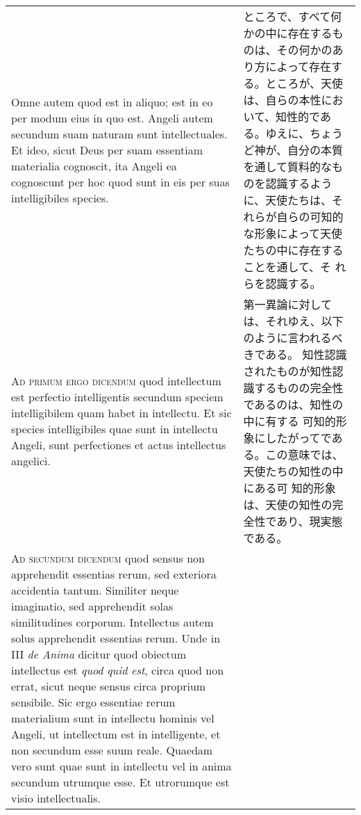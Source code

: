 \documentclass[10pt]{jsarticle} %
\begin{document}
\begin{longtable}{p{21em}p{21em}}
\\


Omne autem quod est in
aliquo; est in eo per modum eius in quo est. Angeli autem secundum suam
naturam sunt intellectuales. Et ideo, sicut Deus per suam essentiam
materialia cognoscit, ita Angeli ea cognoscunt per hoc quod sunt in eis
per suas intelligibiles species.



&

ところで、すべて何かの中に存在するものは、その何かのあり方によって存在す
 る。ところが、天使は、自らの本性において、知性的である。ゆえに、ちょう
 ど神が、自分の本質を通して質料的なものを認識するように、天使たちは、そ
 れらが自らの可知的な形象によって天使たちの中に存在することを通して、そ
 れらを認識する。


\\

{\scshape Ad primum ergo dicendum} quod intellectum est
perfectio intelligentis secundum speciem intelligibilem quam habet in
intellectu. Et sic species intelligibiles quae sunt in intellectu
Angeli, sunt perfectiones et actus intellectus angelici.


&

第一異論に対しては、それゆえ、以下のように言われるべきである。
知性認識されたものが知性認識するものの完全性であるのは、知性の中に有する
 可知的形象にしたがってである。この意味では、天使たちの知性の中にある可
 知的形象は、天使の知性の完全性であり、現実態である。


\\


{\scshape Ad secundum dicendum} quod sensus non
apprehendit essentias rerum, sed exteriora accidentia tantum. Similiter
neque imaginatio, sed apprehendit solas similitudines
corporum. Intellectus autem solus apprehendit essentias rerum. Unde in
III {\itshape de Anima} dicitur quod obiectum intellectus est {\itshape quod quid est}, circa
quod non errat, sicut neque sensus circa proprium sensibile. Sic ergo
essentiae rerum materialium sunt in intellectu hominis vel Angeli, ut
intellectum est in intelligente, et non secundum esse suum
reale. Quaedam vero sunt quae sunt in intellectu vel in anima secundum
utrumque esse. Et utrorumque est visio intellectualis.


&


\end{longtable}
\end{document}
